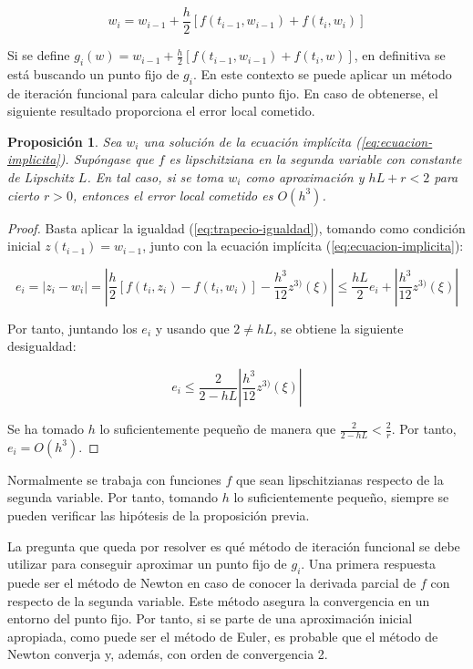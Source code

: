 \documentclass{article}
\theoremstyle{theorem-style}  %
\newtheorem{proposition}[theorem]{Proposición}
\theoremstyle{definition-style}
\theoremstyle{example-style}
\begin{document}
	\begin{equation} \label{eq:ecuacion-implicita}
		w_i = w_{i-1} + \frac{h}{2} \left[f(t_{i-1},w_{i-1}) + f(t_i, w_i)\right]
	\end{equation}

	Si se define $g_i(w) = w_{i-1} + \frac{h}{2} \left[f(t_{i-1},w_{i-1}) + f(t_i, w)\right]$, en definitiva se está buscando un punto fijo de $g_i$. En este contexto se puede aplicar un método de iteración funcional para calcular dicho punto fijo. En caso de obtenerse, el siguiente resultado proporciona el error local cometido.
	
	\begin{proposition} \label{prop:implicito:error}
		Sea $w_i$ una solución de la ecuación implícita (\ref{eq:ecuacion-implicita}). Supóngase que $f$ es lipschitziana en la segunda variable con constante de Lipschitz $L$. En tal caso, si se toma $w_i$ como aproximación y $hL+r < 2$ para cierto $r >0$, entonces el error local cometido es $O(h^3)$.
	\end{proposition}
	
	\begin{proof}
		Basta aplicar la igualdad (\ref{eq:trapecio-igualdad}), tomando como condición inicial $z(t_{i-1}) = w_{i-1}$, junto con la ecuación implícita (\ref{eq:ecuacion-implicita}):

		$$ e_i = \left|z_i - w_i \right| = \left|\frac{h}{2} \left[ f(t_i, z_i) - f(t_i, w_i) \right] - \frac{h^3}{12}z^{3)}(\xi) \right| \le \frac{hL}{2} e_i + \left|\frac{h^3}{12}z^{3)}(\xi) \right| $$
		
		Por tanto, juntando los $e_i$ y usando que $2 \ne hL$, se obtiene la siguiente desigualdad:
		
		$$ e_i \le \frac{2}{2-hL} \left|\frac{h^3}{12}z^{3)}(\xi) \right| $$
		
		Se ha tomado $h$ lo suficientemente pequeño de manera que $\frac{2}{2-hL} < \frac{2}{r}$. Por tanto, $e_i = O(h^3)$. 
	\end{proof}

	Normalmente se trabaja con funciones $f$ que sean lipschitzianas respecto de la segunda variable. Por tanto, tomando $h$ lo suficientemente pequeño, siempre se pueden verificar las hipótesis de la proposición previa.
	
	La pregunta que queda por resolver es qué método de iteración funcional se debe utilizar para conseguir aproximar un punto fijo de $g_i$. Una primera respuesta puede ser el método de Newton en caso de conocer la derivada parcial de $f$ con respecto de la segunda variable. Este método asegura la convergencia en un entorno del punto fijo. Por tanto, si se parte de una aproximación inicial apropiada, como puede ser el método de Euler, es probable que el método de Newton converja y, además, con orden de convergencia 2.
	
\end{document}
